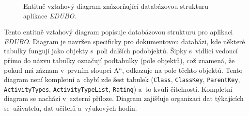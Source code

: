 \documentclass[male,czech,api_bc]{kitheses}
\begin{document}
\begin{figure}[H]
	\centering
	\caption{Entitně vztahový diagram znázorňující databázovou strukturu aplikace \textit{EDUBO}.}
	\label{fig:erd-1}
\end{figure}

Tento entitně vztahový diagram popisuje databázovou strukturu pro aplikaci \textit{EDUBO}. Diagram je navržen specificky pro dokumentovou databázi, kde některé tabulky fungují jako objekty s~poli dalších podobjektů. Šipky s~vidlicí vedoucí přímo do názvu tabulky označují podtabulky (pole objektů), což znamená, že pokud má záznam v~prvním sloupci \quotedblbase A``, odkazuje na pole těchto objektů. Tento diagram není kompletní a~chybí zde šest tabulek (\texttt{Class}, \texttt{ClassKey}, \texttt{ParentKey}, \texttt{ActivityTypes}, \texttt{ActivityTypeList}, \texttt{Rating}) a~to kvůli čitelnosti. Kompletní diagram se nachází v~externí příloze. Diagram zajišťuje organizaci dat týkajících se~uživatelů, dat učitelů a~výukových hodin.
\end{document}
